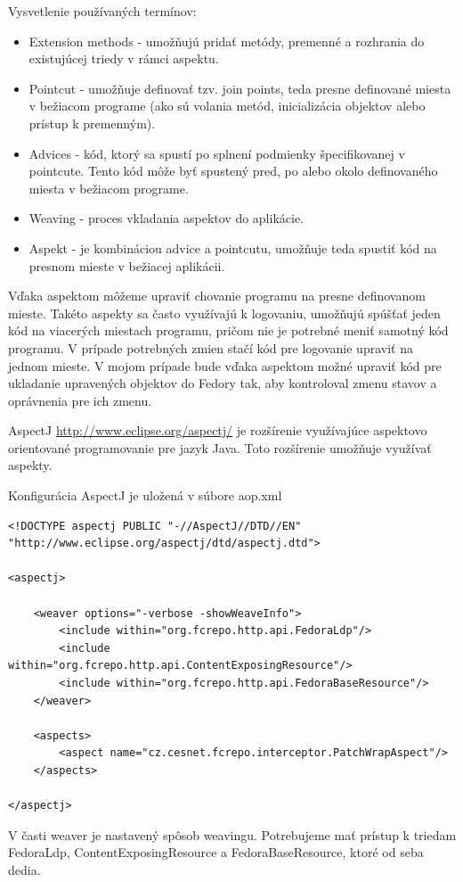 \documentclass[thesis=M,slovak]{FITthesis}[2013/05/06]
\begin{document}
Vysvetlenie používaných termínov:
\begin{itemize}
	\item Extension methods - umožňujú pridať metódy, premenné a rozhrania do existujúcej triedy v rámci aspektu.
	\item Pointcut - umožňuje definovať tzv. join points, teda presne definované miesta v bežiacom programe (ako sú volania metód, inicializácia objektov alebo prístup k premenným).
	\item Advices - kód, ktorý sa spustí po splnení podmienky špecifikovanej v pointcute. Tento kód môže byť spustený pred, po alebo okolo definovaného miesta v bežiacom programe.
	\item Weaving - proces vkladania aspektov do aplikácie.
	\item Aspekt - je kombináciou advice a pointcutu, umožňuje teda spustiť kód na presnom mieste v bežiacej aplikácii.
\end{itemize}
Vďaka aspektom môžeme upraviť chovanie programu na presne definovanom mieste. Takéto aspekty sa často využívajú k logovaniu, umožňujú spúšťať jeden kód na viacerých miestach programu, pričom nie je potrebné meniť samotný kód programu. V prípade potrebných zmien stačí kód pre logovanie upraviť na jednom mieste. \cite{aspect} V mojom prípade bude vďaka aspektom možné upraviť kód pre ukladanie upravených objektov do Fedory tak, aby kontroloval zmenu stavov a oprávnenia pre ich zmenu.

AspectJ \url{http://www.eclipse.org/aspectj/} je rozšírenie využívajúce aspektovo orientované programovanie pre jazyk Java. Toto rozšírenie umožňuje využívať aspekty.

Konfigurácia AspectJ je uložená v súbore aop.xml
\lstset{language=XML}
\begin{lstlisting}[frame=single] 
<!DOCTYPE aspectj PUBLIC "-//AspectJ//DTD//EN" "http://www.eclipse.org/aspectj/dtd/aspectj.dtd">

<aspectj>

    <weaver options="-verbose -showWeaveInfo">
        <include within="org.fcrepo.http.api.FedoraLdp"/>
        <include within="org.fcrepo.http.api.ContentExposingResource"/>
        <include within="org.fcrepo.http.api.FedoraBaseResource"/>
    </weaver>

    <aspects>
        <aspect name="cz.cesnet.fcrepo.interceptor.PatchWrapAspect"/>
    </aspects>

</aspectj>
\end{lstlisting}
V časti weaver je nastavený spôsob weavingu. Potrebujeme mať prístup k triedam FedoraLdp, ContentExposingResource a FedoraBaseResource, ktoré od seba dedia.
\end{document}

